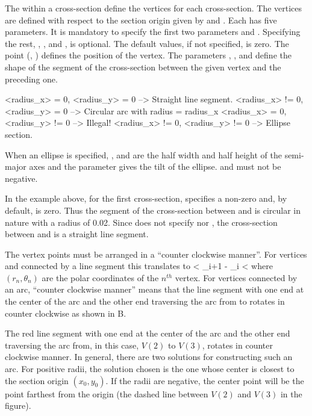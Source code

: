 The  within a cross-section define the vertices for each
cross-section. The vertices are defined with respect to the section
origin given by  and . Each  has five
parameters. It is mandatory to specify the first two parameters
 and . Specifying the rest, ,
, and , is optional. The default values, if
not specified, is zero. The point (, ) defines the
position of the vertex. The parameters ,
, and  define the shape of the segment of
the cross-section between the given vertex and the preceding one.
\begin{example}
  <radius_x>  = 0, <radius_y>  = 0   --> Straight line segment.
  <radius_x> != 0, <radius_y>  = 0   --> Circular arc with radius = radius_x
  <radius_x>  = 0, <radius_y> != 0   --> Illegal!
  <radius_x> != 0, <radius_y> != 0   --> Ellipse section.
\end{example}
When an ellipse is specified, , and  are
the half width and half height of the semi-major axes and the
 parameter gives the tilt of the ellipse. 
and  must not be negative.

In the example above, for the first cross-section, 
specifies a non-zero  and, by default, 
is zero. Thus the segment of the cross-section between  and
 is circular in nature with a radius of 0.02. Since 
does not specify  nor , the
cross-section between  and  is a straight line
segment.

The vertex points must be arranged in a ``counter clockwise manner''. 
For vertices  and  connected by a line segment
this translates to
 < \theta_{i+1} - \theta_{i} \pmod{2\pi} < \pi
\Endeq
where $(r_n, \theta_n)$ are the polar coordinates of the $n^{th}$
vertex. For vertices connected by an arc, ``counter clockwise manner''
means that the line segment with one end at the center of the arc and
the other end traversing the arc from  to 
rotates in counter clockwise as shown in
B. 

The red line segment with one end at the center of the arc and the
other end traversing the arc from, in this case, $V(2)$ to $V(3)$,
rotates in counter clockwise manner. In general, there are two
solutions for constructing such an arc. For positive radii, the
solution chosen is the one whose center is closest to the section
origin $(x_0, y_0)$. If the radii are negative, the center point will
be the point farthest from the origin (the dashed line between $V(2)$
and $V(3)$ in the figure).

